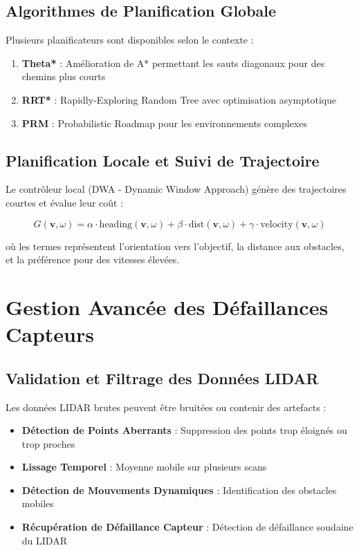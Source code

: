 \documentclass[12pt,a4paper,oneside]{report}
\begin{document}
\subsection{Algorithmes de Planification Globale}

Plusieurs planificateurs sont disponibles selon le contexte :

\begin{enumerate}
  \item \textbf{Theta*} : Amélioration de A* permettant les sauts diagonaux pour des chemins plus courts
  \item \textbf{RRT*} : Rapidly-Exploring Random Tree avec optimisation asymptotique
  \item \textbf{PRM} : Probabilistic Roadmap pour les environnements complexes
\end{enumerate}

\subsection{Planification Locale et Suivi de Trajectoire}

Le contrôleur local (DWA - Dynamic Window Approach) génère des trajectoires courtes et évalue leur coût :

\begin{equation}
G(\mathbf{v}, \omega) = \alpha \cdot \text{heading}(\mathbf{v}, \omega) + \beta \cdot \text{dist}(\mathbf{v}, \omega) + \gamma \cdot \text{velocity}(\mathbf{v}, \omega)
\end{equation}

où les termes représentent l'orientation vers l'objectif, la distance aux obstacles, et la préférence pour des vitesses élevées.

\section{Gestion Avancée des Défaillances Capteurs}

\subsection{Validation et Filtrage des Données LIDAR}

Les données LIDAR brutes peuvent être bruitées ou contenir des artefacts :

\begin{itemize}
  \item \textbf{Détection de Points Aberrants} : Suppression des points trop éloignés ou trop proches
  \item \textbf{Lissage Temporel} : Moyenne mobile sur plusieurs scans
  \item \textbf{Détection de Mouvements Dynamiques} : Identification des obstacles mobiles
  \item \textbf{Récupération de Défaillance Capteur} : Détection de défaillance soudaine du LIDAR
\end{itemize}
\end{document}
